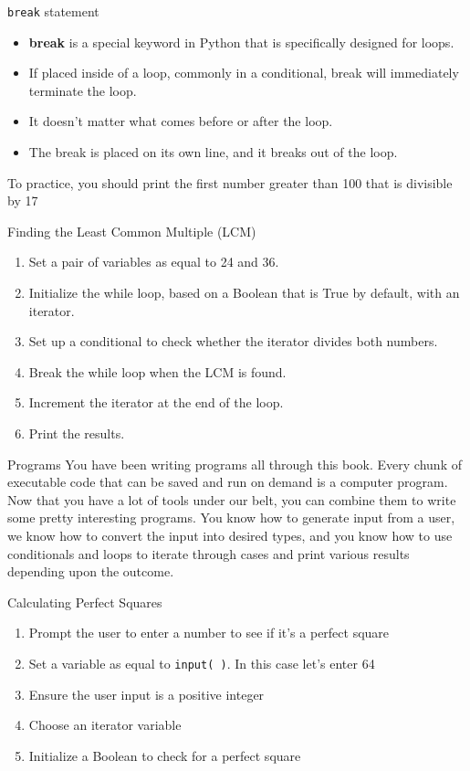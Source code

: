 \documentclass[../main.tex]{subfiles}
\begin{document}
\begin{frame}[fragile]{\texttt{break} statement}
  \begin{itemize} \justifying
  \item \textbf{break} is a special keyword in Python that is specifically designed for loops. 
  \item If placed inside of a loop, commonly in a conditional, break will immediately terminate the loop. 
  \item It doesn't matter what comes before or after the loop. 
  \item The break is placed on its own line, and it breaks out of the loop.
  \end{itemize}

  To practice, you should print the first number greater than 100 that is divisible by 17
\end{frame}

\begin{frameact}{Finding the Least Common Multiple (LCM)}
  \begin{enumerate}\parskip3mm  \justifying
  \item Set a pair of variables as equal to 24 and 36.
  \item Initialize the while loop, based on a Boolean that is True by default, with an iterator.
  \item Set up a conditional to check whether the iterator divides both numbers.
  \item Break the while loop when the LCM is found.
  \item Increment the iterator at the end of the loop.
  \item  Print the results.
  \end{enumerate}
\end{frameact}

\begin{frame}[fragile]{Programs}
  You have been writing programs all through this book. Every chunk of executable code that can be saved and run on demand is a computer program. Now that you have a lot of tools under our belt, you can combine them to write some pretty interesting programs. You know how to generate input from a user, we know how to convert the input into desired types, and you know how to use conditionals and loops to iterate through cases and print various results depending upon the outcome.

  \begin{exercise}{Calculating Perfect Squares}
    \begin{enumerate} \justifying
    \item Prompt the user to enter a number to see if it's a perfect square
    \item Set a variable as equal to \texttt{input( )}. In this case let's enter 64
    \item Ensure the user input is a positive integer
    \item Choose an iterator variable
    \item Initialize a Boolean to check for a perfect square
    \end{enumerate}
  \end{exercise}
\end{frame}
\end{document}
